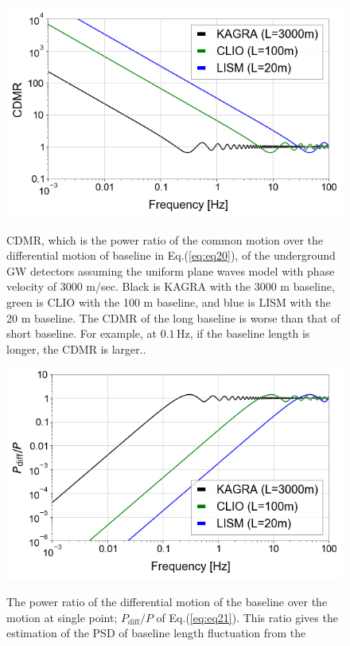 \begin{figure}[p]
  \begin{center}
    \centering
    \includegraphics[width=12cm]{./img_chap3/img329.png}
    \caption{CDMR, which is the power ratio of the common motion over the differential motion of baseline in Eq.(\ref{eq:eq20}), of the underground GW detectors assuming the uniform plane waves model with phase velocity of 3000 m/sec. Black is KAGRA with the 3000 m baseline, green is CLIO with the 100 m baseline, and blue is LISM with the 20 m baseline. The CDMR of the long baseline is worse than that of short baseline. For example, at $0.1\,\mathrm{Hz}$, if the baseline length is longer, the CDMR is larger..}\label{img:img301}
    \centering      
    \includegraphics[width=12cm]{./img_chap3/img328.png}
    \caption{The power ratio of the differential motion of the baseline over the motion at single point; $P_{\mathrm{diff}}/P$ of Eq.(\ref{eq:eq21}). This ratio gives the estimation of the PSD of baseline length fluctuation from the }\label{img:img302}
  \end{center}
\end{figure}



